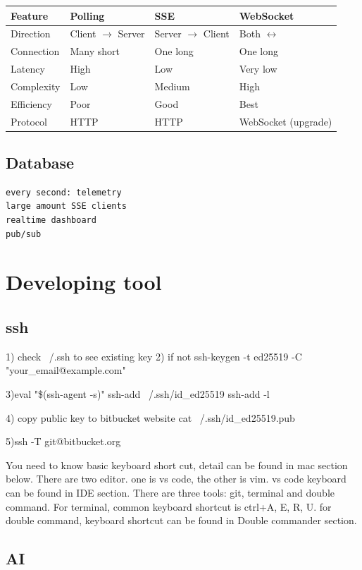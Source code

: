 \documentclass[paper=8.5in:11in, twoside, 12pt, pagesize=pdftex]{book}
\begin{document}
\begin{tabular}{|l|l|l|l|}
\hline
\textbf{Feature} & \textbf{Polling} & \textbf{SSE} & \textbf{WebSocket} \\
\hline
Direction & Client $\rightarrow$ Server & Server $\rightarrow$ Client & Both $\leftrightarrow$ \\
\hline
Connection & Many short & One long & One long \\
\hline
Latency & High & Low & Very low \\
\hline
Complexity & Low & Medium & High \\
\hline
Efficiency & Poor & Good & Best \\
\hline
Protocol & HTTP & HTTP & WebSocket (upgrade) \\
\hline
\end{tabular}


\section{Database}

\begin{lstlisting}
every second: telemetry
large amount SSE clients
realtime dashboard
pub/sub
\end{lstlisting}


\chapter{Developing tool}


\section{ssh}
1) check ~/.ssh to see existing key
2) if not
ssh-keygen -t ed25519 -C "your\_email@example.com"

3)eval "\$(ssh-agent -s)"
ssh-add ~/.ssh/id\_ed25519
ssh-add -l

4) copy public key to bitbucket website
 cat ~/.ssh/id\_ed25519.pub 

5)ssh -T git@bitbucket.org

You need to know basic keyboard short cut,  detail can be found in mac section below.  There are two editor.  one is vs code, the other is vim.  vs code keyboard can be found in IDE section.  There are three tools: git, terminal and double command.  For terminal, common keyboard shortcut is ctrl+A, E, R, U. for double command, keyboard shortcut can be found in Double commander section. 

\section{AI}
\end{document}
